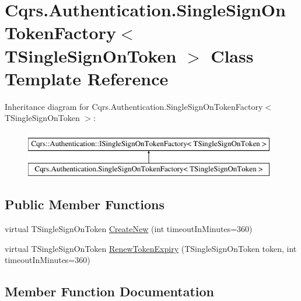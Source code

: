 \hypertarget{classCqrs_1_1Authentication_1_1SingleSignOnTokenFactory}{}\section{Cqrs.\+Authentication.\+Single\+Sign\+On\+Token\+Factory$<$ T\+Single\+Sign\+On\+Token $>$ Class Template Reference}
\label{classCqrs_1_1Authentication_1_1SingleSignOnTokenFactory}
Inheritance diagram for Cqrs.\+Authentication.\+Single\+Sign\+On\+Token\+Factory$<$ T\+Single\+Sign\+On\+Token $>$\+:\begin{figure}[H]
\begin{center}
\leavevmode
\includegraphics[height=2.000000cm]{classCqrs_1_1Authentication_1_1SingleSignOnTokenFactory}
\end{center}
\end{figure}
\subsection*{Public Member Functions}
\begin{DoxyCompactItemize}
\item 
virtual T\+Single\+Sign\+On\+Token \hyperlink{classCqrs_1_1Authentication_1_1SingleSignOnTokenFactory_ab4d01a3600dbe9aa358cd93c98ccf281}{Create\+New} (int timeout\+In\+Minutes=360)
\item 
virtual T\+Single\+Sign\+On\+Token \hyperlink{classCqrs_1_1Authentication_1_1SingleSignOnTokenFactory_a699ceac65874b8319d2e26fa88f554be}{Renew\+Token\+Expiry} (T\+Single\+Sign\+On\+Token token, int timeout\+In\+Minutes=360)
\end{DoxyCompactItemize}


\subsection{Member Function Documentation}
\mbox{\label{classCqrs_1_1Authentication_1_1SingleSignOnTokenFactory_ab4d01a3600dbe9aa358cd93c98ccf281}} 
